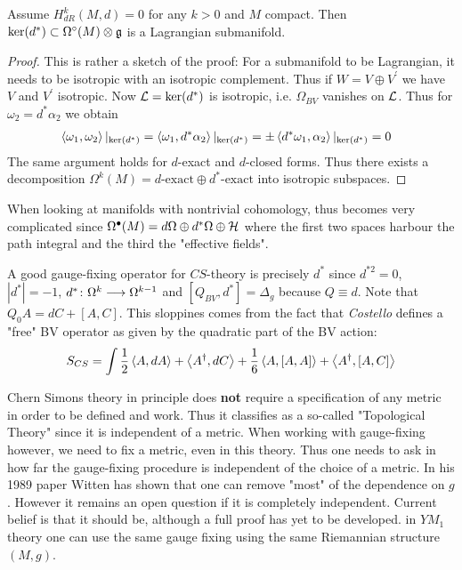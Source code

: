 \begin{prop}
  Assume $H^k_{dR}(M,d) = 0$ for any $k > 0$ and $M$ compact. Then $\ker(d^*) \subset \Omega^\circ(M) \otimes \mathfrak{g}$ is a Lagrangian submanifold.
\begin{proof}
  This is rather a sketch of the proof: For a submanifold to be Lagrangian, it needs to be isotropic with an isotropic complement. Thus if $W = V \oplus V^\prime$ we have $V$ and $V^\prime$ isotropic. Now $\mathcal{L} = \ker(d^*)$ is isotropic, i.e. $\Omega_{BV}$ vanishes on $\mathcal{L}$. Thus for $\omega_2 = d^* \alpha_2$ we obtain
  \begin{align}
    &\left\langle \omega_1 , \omega_2 \right\rangle|_{\ker(d^*)} = \left\langle \omega_1 , d^* \alpha_2 \right\rangle|_{\ker(d^*)} = \pm \left\langle d^* \omega_1 , \alpha_2 \right\rangle|_{\ker(d^*)} = 0
  \end{align}
  The same argument holds for $d$-exact and $d$-closed forms. Thus there exists a decomposition $\Omega^k(M) = d\text{-exact} \oplus d^*\text{-exact}$ into isotropic subspaces.
\end{proof}
\end{prop}

\begin{rem}
  When looking at manifolds with nontrivial cohomology, thus becomes very complicated since
  $\Omega^\bullet(M) = d\Omega \oplus d^* \Omega \oplus {\mathcal{H}}$
  where the first two spaces harbour the path integral and the third the "effective fields".
\end{rem}

A good gauge-fixing operator for $CS$-theory is precisely $d^*$ since $d^{*2} = 0$, $|d^*| = -1$, $d^* \colon \Omega^k \longrightarrow \Omega^{k-1}$ and $[Q_{BV}, d^*] = \Delta_g$ because $Q \equiv d$. Note that $Q_0 A = dC + [A,C]$. This sloppines comes from the fact that \textit{Costello} \cite{Costello} defines a "free" BV operator as given by the quadratic part of the BV action:
\begin{equation}
  S_{CS} = \int \frac{1}{2} \left\langle A , dA \right\rangle + \left\langle A^\dagger , dC \right\rangle + \frac{1}{6} \left\langle A , [A,A] \right\rangle + \left\langle A^\dagger , [A,C] \right\rangle
\end{equation}

\begin{rem}
  Chern Simons theory in principle does \textbf{not} require a specification of any metric in order to be defined and work. Thus it classifies as a so-called "Topological Theory" since it is independent of a metric. When working with gauge-fixing however, we need to fix a metric, even in this theory. Thus one needs to ask in how far the gauge-fixing procedure is independent of the choice of a metric. In his 1989 paper %
  Witten has shown that one can remove "most" of the dependence on $g$. However it remains an open question if it is completely independent. Current belief is that it should be, although a full proof has yet to be developed. in $YM_1$ theory one can use the same gauge fixing using the same Riemannian structure $(M,g)$.
\end{rem}


